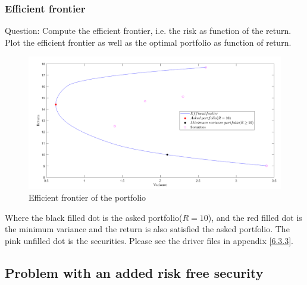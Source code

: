 \subsubsection{\bfseries Efficient frontier}
\begin{shaded}
{ Question:  Compute the efficient frontier, i.e. the risk as function of the return. Plot the efficient frontier as well as the optimal portfolio as function of return.}
\end{shaded}
\begin{figure}[H]
\centering
\includegraphics[scale=0.5]{figures/eff_fro1.PNG}
\caption{Efficient frontier of the portfolio}
\label{fig:labe3.1.4}
\end{figure}
Where the black filled dot is the asked portfolio($R=10$), and the red filled dot is the minimum variance and the return is also satisfied the asked portfolio. The pink unfilled dot is the securities. Please see the driver files in appendix \ref{6.3.3}.

\newpage
\subsection{\bfseries Problem with an added risk free security}
